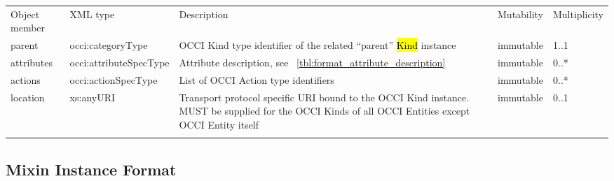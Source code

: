 \documentclass[10pt,a4paper]{article}
\begin{document}
 {
    \begin{tabularx}{\textwidth}{llXll}
    \toprule
    Object member & XML type & Description & Mutability & Multiplicity \\
    \colrule

    parent & occi:categoryType & OCCI Kind type identifier of the
related ``parent'' \hl{Kind} instance & immutable & 1..1 \\

    attributes & occi:attributeSpecType & Attribute description, see
~\ref{tbl:format_attribute_description} & immutable & 0..* \\

    actions & occi:actionSpecType & List of OCCI Action type
identifiers & immutable & 0..* \\

    location & xs:anyURI & Transport protocol specific URI bound to the OCCI Kind
instance. MUST be supplied for the OCCI Kinds of all OCCI Entities except OCCI
Entity itself & immutable & 0..1 \\
    \botrule
    \end{tabularx}
}

\subsection{Mixin Instance Format}
\label{sec:format_mixin}
\end{document}
